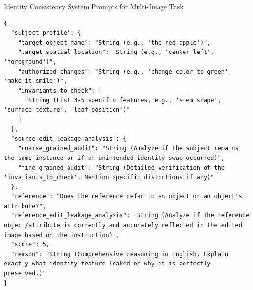 \documentclass{llmxive}
\begin{document}
\begin{promptbox}[label={System Prompts: IC_Multi-Image}]{Identity Consistency System Prompts for Multi-Image Task}
\begin{lstlisting}
{
  "subject_profile": {
    "target_object_name": "String (e.g., 'the red apple')",
    "target_spatial_location": "String (e.g., 'center left', 'foreground')",
    "authorized_changes": "String (e.g., 'change color to green', 'make it smile')",
    "invariants_to_check": [
      "String (List 3-5 specific features, e.g., 'stem shape', 'surface texture', 'leaf position')"
    ]
  },
  "source_edit_leakage_analysis": {
    "coarse_grained_audit": "String (Analyze if the subject remains the same instance or if an unintended identity swap occurred)",
    "fine_grained_audit": "String (Detailed verification of the 'invariants_to_check'. Mention specific distortions if any)"
  },
  "reference": "Does the reference refer to an object or an object's attribute?",
  "reference_edit_leakage_analysis": "String (Analyze if the reference object/attribute is correctly and accurately reflected in the edited image based on the instruction)",
  "score": 5,
  "reason": "String (Comprehensive reasoning in English. Explain exactly what identity feature leaked or why it is perfectly preserved.)"
}
\end{lstlisting}

\end{promptbox}
\end{document}
